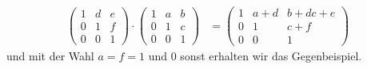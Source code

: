 \begin{loes}
\begin{enumerate}
\begin{align*}
\begin{pmatrix}
1 & d & e \\
0 & 1 & f \\
0 & 0 & 1
\end{pmatrix}
\cdot
\begin{pmatrix}
1 & a & b \\
0 & 1 & c \\
0 & 0 & 1
\end{pmatrix}
&=
\begin{pmatrix}
1 & a+d & b +d c + e \\
0 & 1 & c+f \\
0 & 0 & 1
\end{pmatrix}
\end{align*}
und mit der Wahl $a = f = 1$ und $0$ sonst erhalten wir das Gegenbeispiel.
\end{enumerate}


\end{loes}

